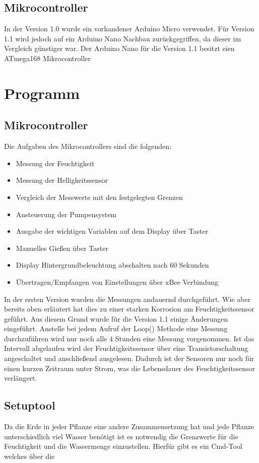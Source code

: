 \documentclass[]{IEEEtran}
\begin{document}
\subsection{Mikrocontroller}
In der Version 1.0 wurde ein vorhandener Arduino Micro verwendet. Für Version 1.1 wird jedoch auf ein Arduino Nano Nachbau zurückgegriffen, da dieser im Vergleich günstiger war. Der Arduino Nano für die Version 1.1 besitzt eien ATmega168 Mikrocontroller
	
\section{Programm}
	
	\subsection{Mikrocontroller}
	Die Aufgaben des Mikrocontrollers sind die folgenden:
		\begin{itemize}
			\item Messung der Feuchtigkeit
			\item Messung der Helligkeitssensor
			\item Vergleich der Messwerte mit den festgelegten Grenzen
			\item Ansteuerung der Pumpensystem
			\item Ausgabe der wichtigen Variablen auf dem Display über Taster
			\item Manuelles Gießen über Taster
			\item Display Hintergrundbeleuchtung abschalten nach 60  Sekunden
			\item Übertragen/Empfangen von Einstellungen über xBee Verbindung
		\end{itemize}
		
	In der ersten Version wurden die Messungen andauernd durchgeführt. Wie aber bereits oben erläutert hat dies zu einer starken Korrosion am Feuchtigkeitssensor geführt. Aus diesem Grund wurde für die Version 1.1 einige Änderungen eingeführt. Anstelle bei jedem Aufruf der Loop() Methode eine Messung durchzuführen wird nur noch alle 4 Stunden eine Messung vorgenommen. Ist das Intervall abgelaufen wird der Feuchtigkeitssensor über eine Transistorschaltung angeschaltet und anschließend ausgelesen. Dadurch ist der Sensoren nur noch für einen kurzen Zeitraum unter Strom, was die Lebensdauer des Feuchtigkeitssensor verlängert.
		
	
	\subsection{Setuptool}
	Da die Erde in jeder Pflanze eine andere Zusammensetzung hat und jede Pflanze unterschiedlich viel Wasser benötigt ist es notwendig die Grenzwerte für die Feuchtigkeit und die Wassermenge einzustellen. Hierfür gibt es ein Cmd-Tool welches über die 
	
\end{document}

